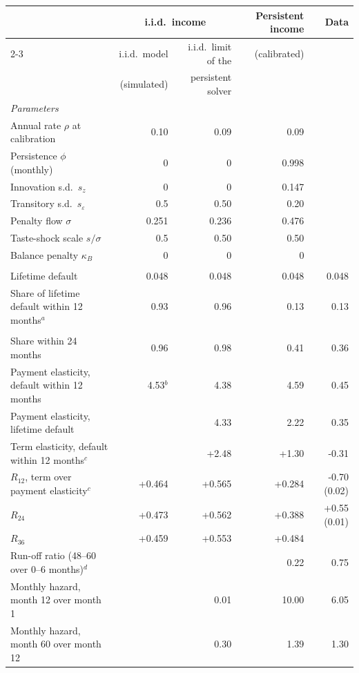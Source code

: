 \begin{tabular}{lrrrr}
\toprule
 & \multicolumn{2}{c}{i.i.d.\ income} & Persistent income & Data \\
\cmidrule(lr){2-3}
 & i.i.d.\ model & i.i.d.\ limit of the & (calibrated) & \\
 & (simulated) & persistent solver & & \\
\midrule
\multicolumn{5}{l}{\emph{Parameters}} \\
Annual rate $\rho$ at calibration & 0.10 & 0.09 & 0.09 &  \\
Persistence $\phi$ (monthly) & 0 & 0 & 0.998 &  \\
Innovation s.d.\ $s_z$ & 0 & 0 & 0.147 &  \\
Transitory s.d.\ $s_\varepsilon$ & 0.5 & 0.50 & 0.20 &  \\
Penalty flow $\sigma$ & 0.251 & 0.236 & 0.476 &  \\
Taste-shock scale $s/\sigma$ & 0.5 & 0.50 & 0.50 &  \\
Balance penalty $\kappa_B$ & 0 & 0 & 0 &  \\
\addlinespace
\multicolumn{5}{l}{\emph{Targeted moments}} \\
Lifetime default & 0.048 & 0.048 & 0.048 & 0.048 \\
Share of lifetime default within 12 months$^{a}$ & 0.93 & 0.96 & 0.13 & 0.13 \\
\addlinespace
\multicolumn{5}{l}{\emph{Untargeted moments}} \\
Share within 24 months & 0.96 & 0.98 & 0.41 & 0.36 \\
Payment elasticity, default within 12 months & 4.53$^{b}$ & 4.38 & 4.59 & 0.45 \\
Payment elasticity, lifetime default &  & 4.33 & 2.22 & 0.35 \\
Term elasticity, default within 12 months$^{c}$ &  & +2.48 & +1.30 & -0.31 \\
$R_{12}$, term over payment elasticity$^{c}$ & +0.464 & +0.565 & +0.284 & -0.70 (0.02) \\
$R_{24}$ & +0.473 & +0.562 & +0.388 & +0.55 (0.01) \\
$R_{36}$ & +0.459 & +0.553 & +0.484 &  \\
Run-off ratio (48--60 over 0--6 months)$^{d}$ &  &  & 0.22 & 0.75 \\
Monthly hazard, month 12 over month 1 &  & 0.01 & 10.00 & 6.05 \\
Monthly hazard, month 60 over month 12 &  & 0.30 & 1.39 & 1.30 \\
\bottomrule
\end{tabular}

